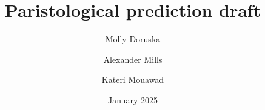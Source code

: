 \documentclass[12pt]{article}
\title{Paristological prediction draft}
\author{ Molly Doruska \and Alexander Mills \and Kateri Mouawad}
\date{\vspace{1ex}January 2025}
\begin{document}
\maketitle

\renewcommand{\arraystretch}{1.5}

\end{document}
